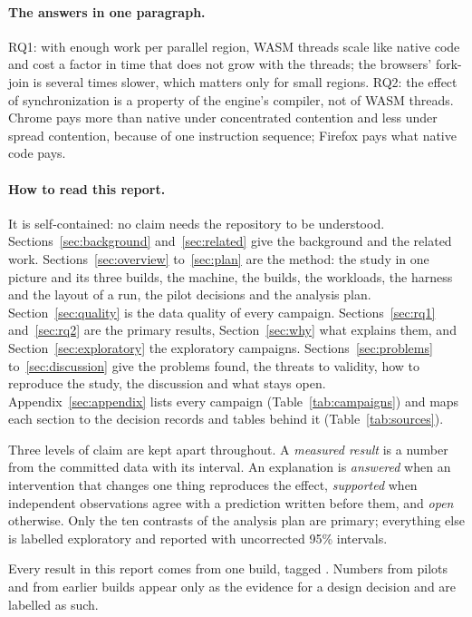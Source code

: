 \paragraph{The answers in one paragraph.} RQ1: with enough work per parallel
region, WASM threads scale like native code and cost a factor in time that does
not grow with the threads; the browsers' fork-join is several times slower, which matters only
for small regions. RQ2: the effect of synchronization is a property of the
engine's compiler, not of WASM threads. Chrome pays more than native under
concentrated contention and less under spread contention, because of one
instruction sequence; Firefox pays what native code pays.

\paragraph{How to read this report.} It is self-contained: no claim needs the
repository to be understood. Sections~\ref{sec:background}
and~\ref{sec:related} give the background and the related work.
Sections~\ref{sec:overview} to~\ref{sec:plan} are the method: the study in
one picture and its three builds, the machine, the builds, the workloads,
the harness and the layout of a run, the pilot decisions and the analysis
plan. Section~\ref{sec:quality} is the data quality of every campaign.
Sections~\ref{sec:rq1} and~\ref{sec:rq2} are the primary results,
Section~\ref{sec:why} what explains them, and Section~\ref{sec:exploratory}
the exploratory campaigns. Sections~\ref{sec:problems}
to~\ref{sec:discussion} give the problems found, the threats to validity,
how to reproduce the study, the discussion and what stays open.
Appendix~\ref{sec:appendix} lists every campaign
(Table~\ref{tab:campaigns}) and maps each section to the decision records
and tables behind it (Table~\ref{tab:sources}).

Three levels of claim are kept apart throughout. A \emph{measured result}
is a number from the committed data with its interval. An explanation is
\emph{answered} when an intervention that changes one thing reproduces the
effect, \emph{supported} when independent observations agree with a
prediction written before them, and \emph{open} otherwise. Only the ten
contrasts of the analysis plan are primary; everything else is labelled
exploratory and reported with uncorrected 95\% intervals.

Every result in this report comes from one build, tagged
. Numbers from pilots and from earlier builds appear only
as the evidence for a design decision and are labelled as such.
